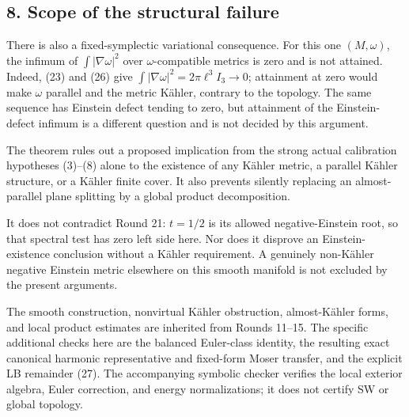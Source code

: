 \documentclass[
  11pt,
]{article}
\begin{document}
\hypertarget{scope-of-the-structural-failure}{%
\subsection{8. Scope of the structural
failure}\label{scope-of-the-structural-failure}}

There is also a fixed-symplectic variational consequence. For this one
\((M,\omega)\), the infimum of \(\int|\nabla\omega|^2\) over
\(\omega\)-compatible metrics is zero and is not attained. Indeed, (23)
and (26) give \(\int|\nabla\omega|^2=2\pi\ell^3I_3\to0\); attainment at
zero would make \(\omega\) parallel and the metric Kähler, contrary to
the topology. The same sequence has Einstein defect tending to zero, but
attainment of the Einstein-defect infimum is a different question and is
not decided by this argument.

The theorem rules out a proposed implication from the strong actual
calibration hypotheses (3)--(8) alone to the existence of any Kähler
metric, a parallel Kähler structure, or a Kähler finite cover. It also
prevents silently replacing an almost-parallel plane splitting by a
global product decomposition.

It does not contradict Round 21: \(t=1/2\) is its allowed
negative-Einstein root, so that spectral test has zero left side here.
Nor does it disprove an Einstein-existence conclusion without a Kähler
requirement. A genuinely non-Kähler negative Einstein metric elsewhere
on this smooth manifold is not excluded by the present arguments.

The smooth construction, nonvirtual Kähler obstruction, almost-Kähler
forms, and local product estimates are inherited from Rounds 11--15. The
specific additional checks here are the balanced Euler-class identity,
the resulting exact canonical harmonic representative and fixed-form
Moser transfer, and the explicit LB remainder (27). The accompanying
symbolic checker verifies the local exterior algebra, Euler correction,
and energy normalizations; it does not certify SW or global topology.
\end{document}
